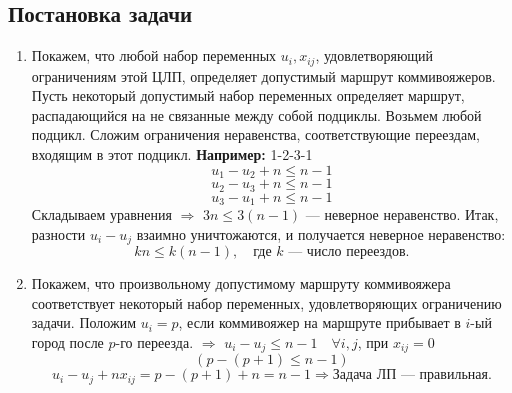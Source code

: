 \documentclass[17pt]{extarticle}
\begin{document}
\subsection{Постановка задачи}
\begin{enumerate}
    \item Покажем, что любой набор переменных \( u_i, x_{ij} \), удовлетворяющий ограничениям этой ЦЛП, определяет допустимый маршрут коммивояжеров.
          Пусть некоторый допустимый набор переменных определяет маршрут, распадающийся на не связанные между собой подциклы. Возьмем любой подцикл.
          Сложим ограничения неравенства, соответствующие переездам, входящим в этот подцикл.
          \textbf{Например:}
          1-2-3-1
          \[
              u_1 - u_2 + n \leq n-1
          \]
          \[
              u_2 - u_3 + n \leq n-1
          \]
          \[
              u_3 - u_1 + n \leq n-1
          \]
          Складываем уравнения \(\Rightarrow\) \( 3n \leq 3(n-1) \) — неверное неравенство.
          Итак, разности \( u_i - u_j \) взаимно уничтожаются, и получается неверное неравенство:
          \[
              kn \leq k(n-1), \quad \text{где } k \text{ — число переездов.}
          \]

    \item Покажем, что произвольному допустимому маршруту коммивояжера \\ соответствует некоторый набор переменных, удовлетворяющих ограничению задачи.
          Положим \( u_i = p \), если коммивояжер на маршруте прибывает в \( i \)-ый город после \( p \)-го переезда.
          \(\Rightarrow\) \( u_i - u_j \leq n-1 \quad \forall i, j \), при \( x_{ij} = 0 \)
          \[
              (p - (p+1) \leq n-1)
          \]
          \[
              u_i - u_j + nx_{ij} = p - (p+1) + n = n-1 \Rightarrow \text{Задача ЛП — правильная.}
          \]
\end{enumerate}
\end{document}
